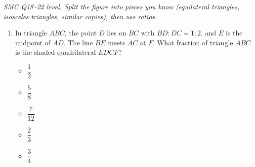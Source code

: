 \documentclass[11pt,a4paper]{article}
\begin{document}
\noindent\textit{SMC Q18--22 level. Split the figure into pieces you know (equilateral triangles, isosceles triangles, similar copies), then use ratios.}

\begin{enumerate}

\item \begin{minipage}[t]{0.60\linewidth}
In triangle $ABC$, the point $D$ lies on $BC$ with $BD:DC=1:2$, and $E$ is the midpoint of $AD$. The line $BE$ meets $AC$ at $F$. What fraction of triangle $ABC$ is the shaded quadrilateral $EDCF$?
\begin{itemize}[itemsep=3pt]
\item[A)] $\dfrac12$
\item[B)] $\dfrac58$
\item[C)] $\dfrac7{12}$
\item[D)] $\dfrac23$
\item[E)] $\dfrac34$
\end{itemize}
\end{minipage}\hfill
\begin{minipage}[t]{0.34\linewidth}
\vspace{0pt}
\centering
{}
\end{minipage}


\end{enumerate}
\end{document}
